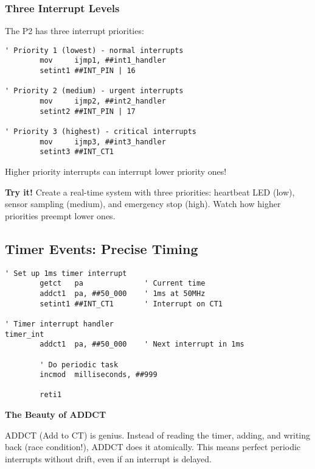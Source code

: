 \documentclass[11pt]{book}
\begin{document}
\hypertarget{three-interrupt-levels}{%
\subsubsection{Three Interrupt Levels}\label{three-interrupt-levels}}

The P2 has three interrupt priorities:

\begin{lstlisting}
' Priority 1 (lowest) - normal interrupts
        mov     ijmp1, ##int1_handler
        setint1 ##INT_PIN | 16
        
' Priority 2 (medium) - urgent interrupts  
        mov     ijmp2, ##int2_handler
        setint2 ##INT_PIN | 17
        
' Priority 3 (highest) - critical interrupts
        mov     ijmp3, ##int3_handler
        setint3 ##INT_CT1
\end{lstlisting}

Higher priority interrupts can interrupt lower priority ones!

\textbf{Try it!} Create a real-time system with three priorities:
heartbeat LED (low), sensor sampling (medium), and emergency stop
(high). Watch how higher priorities preempt lower ones.

\hypertarget{timer-events-precise-timing}{%
\subsection{Timer Events: Precise
Timing}\label{timer-events-precise-timing}}

\begin{lstlisting}
' Set up 1ms timer interrupt
        getct   pa              ' Current time
        addct1  pa, ##50_000    ' 1ms at 50MHz
        setint1 ##INT_CT1       ' Interrupt on CT1
        
' Timer interrupt handler
timer_int
        addct1  pa, ##50_000    ' Next interrupt in 1ms
        
        ' Do periodic task
        incmod  milliseconds, ##999
        
        reti1
\end{lstlisting}

\begin{interlude}
\textbf{The Beauty of ADDCT}

ADDCT (Add to CT) is genius. Instead of reading the timer, adding, and writing back (race condition!), ADDCT does it atomically. This means perfect periodic interrupts without drift, even if an interrupt is delayed.
\end{interlude}
\end{document}
